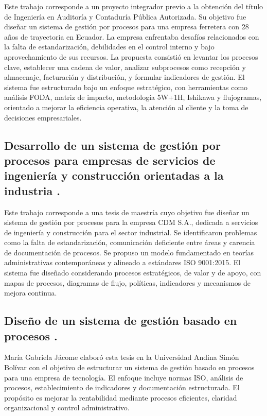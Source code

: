 Este trabajo corresponde a un proyecto integrador previo a la obtención del título de Ingeniería en Auditoría y Contaduría Pública Autorizada. Su objetivo fue diseñar un sistema de gestión por procesos para una empresa ferretera con 28 años de trayectoria en Ecuador. La empresa enfrentaba desafíos relacionados con la falta de estandarización, debilidades en el control interno y bajo aprovechamiento de sus recursos. La propuesta consistió en levantar los procesos clave, establecer una cadena de valor, analizar subprocesos como recepción y almacenaje, facturación y distribución, y formular indicadores de gestión. El sistema fue estructurado bajo un enfoque estratégico, con herramientas como análisis FODA, matriz de impacto, metodología 5W+1H, Ishikawa y flujogramas, orientado a mejorar la eficiencia operativa, la atención al cliente y la toma de decisiones empresariales.

\subsection{Desarrollo de un sistema de gestión por procesos para empresas de servicios de ingeniería y construcción orientadas a la industria \cite{Munoz2018}.}

Este trabajo corresponde a una tesis de maestría cuyo objetivo fue diseñar un sistema de gestión por procesos para la empresa CDM S.A., dedicada a servicios de ingeniería y construcción para el sector industrial. Se identificaron problemas como la falta de estandarización, comunicación deficiente entre áreas y carencia de documentación de procesos. Se propuso un modelo fundamentado en teorías administrativas contemporáneas y alineado a estándares ISO 9001:2015. El sistema fue diseñado considerando procesos estratégicos, de valor y de apoyo, con mapas de procesos, diagramas de flujo, políticas, indicadores y mecanismos de mejora continua.

\subsection{Diseño de un sistema de gestión basado en procesos \cite{Jacome2016}.}

María Gabriela Jácome elaboró esta tesis en la Universidad Andina Simón Bolívar con el objetivo de estructurar un sistema de gestión basado en procesos para una empresa de tecnología. El enfoque incluye normas ISO, análisis de procesos, establecimiento de indicadores y documentación estructurada. El propósito es mejorar la rentabilidad mediante procesos eficientes, claridad organizacional y control administrativo.

